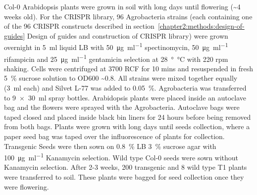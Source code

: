 \documentclass[../main.tex]{subfiles}
\begin{document}
Col-0 Arabidopsis plants were grown in soil with long days until flowering (\textasciitilde{}4 weeks old).
For the CRISPR library, 96 Agrobacteria strains (each containing one of the 96 CRISPR constructs described in section~\ref{chapter2:methods:design-of-guides} Design of guides and construction of CRISPR library) were grown overnight in \SI{5}{\ml} liquid LB with \SI{50}{\micro\gram\per\ml} spectinomycin, \SI{50}{\micro\gram\per\ml} rifampicin and \SI{25}{\micro\gram\per\ml} gentamicin selection at \SI{28}{\degree\celsius} with 220 rpm shaking.
Cells were centrifuged at 3700 RCF for 10 mins and resuspended in fresh \SI{5}{\percent} sucrose solution to OD600 \textasciitilde{}0.8.
All strains were mixed together equally (\SI{3}{\ml} each) and Silvet L-77 was added to \SI{0.05}{\percent}.
Agrobacteria was transferred to \SI{9x30}{\ml} spray bottles.
Arabidopsis plants were placed inside an autoclave bag and the flowers were sprayed with the Agrobacteria.
Autoclave bags were taped closed and placed inside black bin liners for 24 hours before being removed from both bags.
Plants were grown with long days until seeds collection, where a paper seed bag was taped over the influorescence of plants for collection.
Transgenic Seeds were then sown on \SI{0.8}{\percent} LB \SI{3}{\percent} sucrose agar with \SI{100}{\micro\gram\per\ml} Kanamycin selection.
Wild type Col-0 seeds were sown without Kanamycin selection.
After 2-3 weeks, 200 transgenic and 8 wild type T1 plants were transferred to soil.
These plants were bagged for seed collection once they were flowering.
\end{document}
